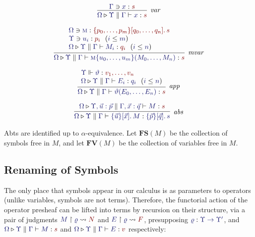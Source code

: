 \documentclass[11pt]{article}
\theoremstyle{definition}
\theoremstyle{remark}
\numberwithin{equation}{section}
\def\IModeColorName{MidnightBlue}
\def\OModeColorName{Maroon}
\newcommand\IMode[1]{{\color{\IModeColorName}{#1}}}
\newcommand\OMode[1]{{\color{\OModeColorName}{#1}}}
\newcommand\HypJ[2]{#1\ \ (#2)}
\newcommand\Of[2]{\IMode{#1}: \IMode{#2}}
\newcommand\MkValence[3]{%
  \ifthenelse{\equal{#1}{}}{}{%
    \{#1\}%
  }%
  \ifthenelse{\equal{#2}{}}{}{%
    [#2]%
  }.\, #3%
}
\newcommand\MkBTm[3]{\{#1\}[#2].\, #3}
\newcommand\Leq[2]{\IMode{#1}\leq\IMode{#2}}
\newcommand\IsOperator[3]{\IMode{#1}\Vdash\IMode{#2}: \OMode{#3}}
\newcommand\Lookup[3]{\IMode{#1}\ni\IMode{#2}:\OMode{#3}}
\newcommand\IsAbt[5]{%
  \IMode{#1}\triangleright%
  \IMode{#2}\parallel%
  \IMode{#3}\vdash%
  \IMode{#4}:\OMode{#5}%
}
\newcommand\IsBTm[5]{%
  \IMode{#1}\triangleright%
  \IMode{#2}\parallel%
  \IMode{#3}\vdash%
  \IMode{#4}:\IMode{#5}%
}
\newcommand\MV[1]{\textsc{#1}}
\newcommand\MApp[3]{#1\{#2\}(#3)}
\newcommand\App[2]{#1(#2)}
\newcommand\FV[1]{\mathbf{FV}\left(#1\right)}
\newcommand\FS[1]{\mathbf{FS}\left(#1\right)}
\newcommand\Rename[2]{%
  #2\upharpoonright#1%
}
\newcommand\IsRenaming[3]{%
  \Rename{\IMode{#1}}{\IMode{#2}}%
  \leadsto\OMode{#3}%
}
\begin{document}
\begin{gather*}
  \infer[\textit{var}]{
    \IsAbt{\Omega}{\Upsilon}{\Gamma}{x}{s}
  }{
    \Lookup{\Gamma}{x}{s}
  }\\[6pt]
  \infer[\textit{mvar}]{
    \IsAbt{\Omega}{\Upsilon}{\Gamma}{
      \MApp{\MV{m}}{u_0,\dots,u_m}{M_0,\dots,M_n}
    }{s}
  }{
    \begin{array}{l}
      \Lookup{\Omega}{\MV{m}}{\MkValence{p_0,\dots,p_m}{q_0,\dots,q_n}{s}}\\
      \HypJ{\Lookup{\Upsilon}{u_i}{p_i}}{\Leq{i}{m}}\\
      \HypJ{
        \IsAbt{\Omega}{\Upsilon}{\Gamma}{M_i}{q_i}
      }{
        \Leq{i}{n}
      }
    \end{array}
  }\\[6pt]
  \infer[\textit{app}]{
    \IsAbt{\Omega}{\Upsilon}{\Gamma}{
      \App{\vartheta}{E_0,\dots,E_n}
    }{s}
  }{
    \begin{array}{l}
      \IsOperator{\Upsilon}{\vartheta}{
        v_1,\dots,v_n
      }\\
      \HypJ{
        \IsBTm{\Omega}{\Upsilon}{\Gamma}{E_i}{q_i}
      }{
        \Leq{i}{n}
      }
    \end{array}
  }\\[6pt]
  \infer[\textit{abs}]{
    \IsBTm{\Omega}{\Upsilon}{\Gamma}{
      \MkBTm{\vec{u}}{\vec{x}}{M}
    }{
      \MkValence{\vec{p}}{\vec{q}}{s}
    }
  }{
    \IsAbt{\Omega}{\Upsilon, \vec{u}:\vec{p}}{\Gamma,\vec{x}:{\vec{q}}}{
      M
    }{
      s
    }
  }
\end{gather*}

Abts are identified up to $\alpha$-equivalence. Let $\FS{M}$ be the collection
of symbols free in $M$, and let $\FV{M}$ be the collection of variables free in
$M$. %

\subsection{Renaming of Symbols}

The only place that symbols appear in our calculus is as parameters to
operators (unlike variables, symbols are not terms). Therefore, the functorial
action of the operator presheaf can be lifted into terms by recursion on their
structure, via a pair of judgments $\IsRenaming{\varrho}{M}{N}$ and
$\IsRenaming{\varrho}{E}{F}$, presupposing
$\Of{\varrho}{\Upsilon\to\Upsilon'}$, and $\IsAbt{\Omega}{\Upsilon}{\Gamma}{M}{s}$
and $\IsAbt{\Omega}{\Upsilon}{\Gamma}{E}{v}$ respectively:
\end{document}
